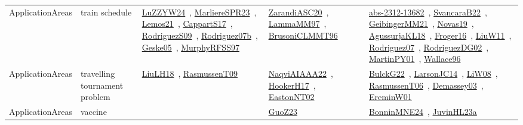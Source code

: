 {\begin{longtable}{lp{3cm}>{\raggedright\arraybackslash}p{6cm}>{\raggedright\arraybackslash}p{6cm}>{\raggedright\arraybackslash}p{8cm}}
\index{train schedule}\index{ApplicationAreas!train schedule}ApplicationAreas & train schedule & \href{../works/LuZZYW24.pdf}{LuZZYW24}~\cite{LuZZYW24}, \href{../works/MarliereSPR23.pdf}{MarliereSPR23}~\cite{MarliereSPR23}, \href{../works/Lemos21.pdf}{Lemos21}~\cite{Lemos21}, \href{../works/CappartS17.pdf}{CappartS17}~\cite{CappartS17}, \href{../works/RodriguezS09.pdf}{RodriguezS09}~\cite{RodriguezS09}, \href{../works/Rodriguez07b.pdf}{Rodriguez07b}~\cite{Rodriguez07b}, \href{../works/Geske05.pdf}{Geske05}~\cite{Geske05}, \href{../works/MurphyRFSS97.pdf}{MurphyRFSS97}~\cite{MurphyRFSS97} & \href{../works/ZarandiASC20.pdf}{ZarandiASC20}~\cite{ZarandiASC20}, \href{../works/LammaMM97.pdf}{LammaMM97}~\cite{LammaMM97}, \href{../works/BrusoniCLMMT96.pdf}{BrusoniCLMMT96}~\cite{BrusoniCLMMT96} & \href{../works/abs-2312-13682.pdf}{abs-2312-13682}~\cite{abs-2312-13682}, \href{../works/SvancaraB22.pdf}{SvancaraB22}~\cite{SvancaraB22}, \href{../works/GeibingerMM21.pdf}{GeibingerMM21}~\cite{GeibingerMM21}, \href{../works/Novas19.pdf}{Novas19}~\cite{Novas19}, \href{../works/AgussurjaKL18.pdf}{AgussurjaKL18}~\cite{AgussurjaKL18}, \href{../works/Froger16.pdf}{Froger16}~\cite{Froger16}, \href{../works/LiuW11.pdf}{LiuW11}~\cite{LiuW11}, \href{../works/Rodriguez07.pdf}{Rodriguez07}~\cite{Rodriguez07}, \href{../works/RodriguezDG02.pdf}{RodriguezDG02}~\cite{RodriguezDG02}, \href{../works/MartinPY01.pdf}{MartinPY01}~\cite{MartinPY01}, \href{../works/Wallace96.pdf}{Wallace96}~\cite{Wallace96}\\
\index{travelling tournament problem}\index{ApplicationAreas!travelling tournament problem}ApplicationAreas & travelling tournament problem & \href{../works/LiuLH18.pdf}{LiuLH18}~\cite{LiuLH18}, \href{../works/RasmussenT09.pdf}{RasmussenT09}~\cite{RasmussenT09} & \href{../works/NaqviAIAAA22.pdf}{NaqviAIAAA22}~\cite{NaqviAIAAA22}, \href{../works/HookerH17.pdf}{HookerH17}~\cite{HookerH17}, \href{../works/EastonNT02.pdf}{EastonNT02}~\cite{EastonNT02} & \href{../works/BulckG22.pdf}{BulckG22}~\cite{BulckG22}, \href{../works/LarsonJC14.pdf}{LarsonJC14}~\cite{LarsonJC14}, \href{../works/LiW08.pdf}{LiW08}~\cite{LiW08}, \href{../works/RasmussenT06.pdf}{RasmussenT06}~\cite{RasmussenT06}, \href{../works/Demassey03.pdf}{Demassey03}~\cite{Demassey03}, \href{../works/EreminW01.pdf}{EreminW01}~\cite{EreminW01}\\
\index{vaccine}\index{ApplicationAreas!vaccine}ApplicationAreas & vaccine &  & \href{../works/GuoZ23.pdf}{GuoZ23}~\cite{GuoZ23} & \href{../works/BonninMNE24.pdf}{BonninMNE24}~\cite{BonninMNE24}, \href{../works/JuvinHL23a.pdf}{JuvinHL23a}~\cite{JuvinHL23a}\\

\end{longtable}}

